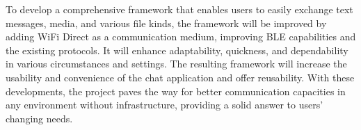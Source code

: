 \documentclass[12pt, conference, onecolumn, a4paper]{IEEEtran}
\begin{document}
To develop a comprehensive framework that enables users to easily exchange text
messages, media, and various file kinds, the framework will be improved by
adding WiFi Direct as a communication medium, improving BLE capabilities and
the existing protocols. It will enhance adaptability, quickness, and
dependability in various circumstances and settings. The resulting framework
will increase the usability and convenience of the chat application and offer
reusability. With these developments, the project paves the way for better
communication capacities in any environment without infrastructure, providing a
solid answer to users' changing needs.


% 
% 



\end{document}
